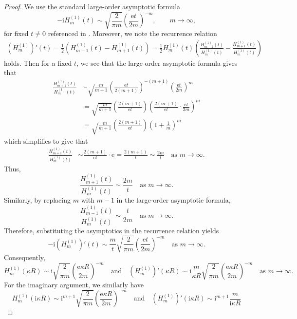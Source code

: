 \documentclass{article}
\begin{document}
\begin{proof}
We use the standard large-order asymptotic formula
\[
-\mathrm{i}H_m^{(1)}(t)
\sim
\sqrt{\frac{2}{\pi m}}
\left(\frac{\mathrm et}{2m}\right)^{-m},
\qquad m\to\infty,
\]
for fixed $t\neq0$ referenced in \cite{NIST:DLMF}. Moreover, we note the recurrence relation
\begin{align*}
(H_m^{(1)})'(t)=
\frac12\left(
H_{m-1}^{(1)}(t)-H_{m+1}^{(1)}(t)
\right)= \frac{1}{2}H_m^{(1)}(t)\left(\frac{H_{m-1}^{(1)}(t)}{H_m^{(1)}(t)}-\frac{H_{m+1}^{(1)}(t)}{H_m^{(1)}(t)}\right)
\end{align*}
holds. Then for a fixed $t$, we see that the large-order asymptotic formula gives that 
\begin{align*}
    \frac{H_{m+1}^{(1)}(t)}{H_m^{(1)}(t)}&\sim \sqrt{\frac{m}{m+1}}\left(\frac{\mathrm et}{2(m+1)}\right)^{-(m+1)}\left(\frac{\mathrm et}{2m}\right)^{m}\\
    &=\sqrt{\frac{m}{m+1}}\left(\frac{2(m+1)}{\mathrm et}\right)\left(\frac{2(m+1)}{\mathrm et}\cdot \frac{\mathrm et}{2m}\right)^m\\
    &=\sqrt{\frac{m}{m+1}}\left(\frac{2(m+1)}{\mathrm et}\right)\left(1+\frac{1}{m}\right)^m
    \end{align*}
    which simplifies to give that 
    \begin{align*}
    \frac{H_{m+1}^{(1)}(t)}{H_m^{(1)}(t)}&\sim   \frac{2(m+1)}{\mathrm{e}t}\cdot \mathrm{e} =\frac{2(m+1)}{t}\sim \frac{2m}{t} \quad \text{as $m\to\infty$.}
\end{align*}
Thus,
\[
\frac{H_{m+1}^{(1)}(t)}{H_m^{(1)}(t)}
\sim \frac{2m}{t}\quad \text{as $m\to\infty$.}
\]
Similarly, by replacing $m$ with $m-1$ in the large-order asymptotic formula,
\[
\frac{H_{m-1}^{(1)}(t)}{H_m^{(1)}(t)}
\sim \frac{t}{2m} \quad \text{as $m\to\infty$.}
\]
Therefore, substituting the asymptotics in the recurrence relation yields
\[
-\mathrm i(H_m^{(1)})'(t)
\sim
\frac{m}{t}
\sqrt{\frac{2}{\pi m}}
\left(\frac{\mathrm et}{2m}\right)^{-m}\quad \text{as $m\to\infty$.}
\]
Consequently,
\[
H_m^{(1)}(\kappa R)
\sim
\mathrm i\sqrt{\frac{2}{\pi m}}
\left(\frac{\mathrm{e}\kappa R}{2m}\right)^{-m}\quad \text{and}\quad (H_m^{(1)})'(\kappa R)
\sim
\mathrm i\frac{m}{\kappa R}
\sqrt{\frac{2}{\pi m}}
\left(\frac{\text{e}\kappa R}{2m}\right)^{-m} \quad \text{as $m\to\infty$.}
\]
For the imaginary argument, we similarly have
\[
H_m^{(1)}(\mathrm{i}\kappa R)
\sim
\mathrm i^{m+1}
\sqrt{\frac{2}{\pi m}}
\left(\frac{\mathrm{e}\kappa R}{2m}\right)^{-m}\quad \text{and}\quad (H_m^{(1)})'(\mathrm{i}\kappa R)
\sim
\mathrm{i}^{m+1}\frac{m}{\text{i}\kappa R}
\]
\end{proof}
\end{document}
